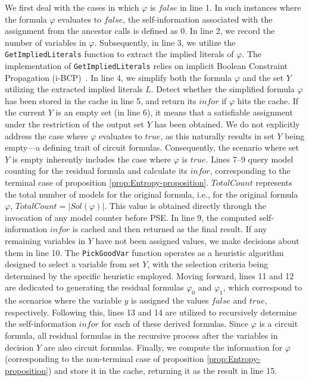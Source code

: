 We first deal with the cases in which $\varphi$ is $\mathit{false}$ in line 1.  
In such instances where the formula $\varphi$ evaluates to $\mathit{false}$, the self-information associated with the assignment from the ancestor calls is defined as 0.
In line 2, we record the number of variables in $\varphi$. 
Subsequently, in line 3, we utilize the \texttt{GetImpliedLiterals} function to extract the implied literals of $\varphi$.
The implementation of \texttt{GetImpliedLiterals} relies on implicit Boolean Constraint Propagation (i-BCP)~\cite{thurley2006sharpsat}. 
In line 4, we simplify both the formula $\varphi$ and the set $Y$ utilizing the extracted implied literals $L$.
Detect whether the simplified formula $\varphi$ has been stored  in the cache in line 5, and return its $\mathit{infor}$ if $\varphi$ hits the cache.
If the current $Y$ is an empty set (in line 6), it means that a satisfiable assignment under the restriction of the output set $Y$ has been obtained. 
We do not explicitly address the case where $\varphi$ evaluates to $\mathit{true}$, as this naturally results in set $Y$ being empty—a defining trait of circuit formulas.
Consequently, the scenario where set $Y$ is empty inherently includes the case where $\varphi$ is $\mathit{true}$.
Lines 7--9 query model counting for the residual formula and calculate its $\mathit{infor}$, corresponding to the terminal case of proposition \ref{prop:Entropy-proposition}.
$TotalCount$ represents the total number of models for the original formula, i.e., for the original formula $\varphi$, $TotalCount= |\mathit{Sol}(\varphi)|$. 
This value is obtained directly through the invocation of any model counter before PSE.
In line 9, the computed self-information $\mathit{infor}$ is cached and then returned as the final result.
If any remaining variables in $Y$ have not been assigned values, we make decisions about them in line 10.
The \texttt{PickGoodVar} function operates as a heuristic algorithm designed to select a variable from set $Y$, with the selection criteria being determined by the specific heuristic employed.
Moving forward, lines 11 and 12 are dedicated to generating the residual formulas $\varphi_0$ and $\varphi_1$, which correspond to the scenarios where the variable $y$ is assigned the values $\mathit{false}$ and $\mathit{true}$, respectively. Following this, lines 13 and 14 are utilized to recursively determine the self-information $\mathit{infor}$ for each of these derived formulas.
Since $\varphi$ is a circuit formula, all residual formulas in the recursive process after the variables in decision $Y$ are also circuit formulas.
Finally, we compute the information for $\varphi$ (corresponding to the non-terminal case of proposition \ref{prop:Entropy-proposition}) and store it in the cache, returning it as the result in line 15.


